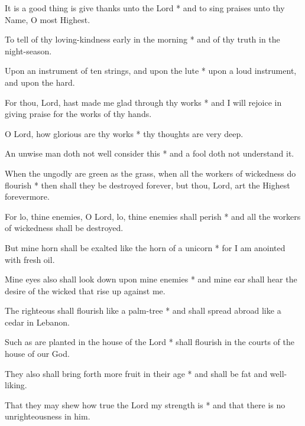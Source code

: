 It is a good thing is give thanks unto the Lord * and to sing praises unto thy Name, O most Highest.

To tell of thy loving-kindness early in the morning * and of thy truth in the night-season.

Upon an instrument of ten strings, and upon the lute * upon a loud instrument, and upon the hard.

For thou, Lord, hast made me glad through thy works * and I will rejoice in giving praise for the works of thy hands.

O Lord, how glorious are thy works * thy thoughts are very deep.

An unwise man doth not well consider this * and a fool doth not understand it.

When the ungodly are green as the grass, when all the workers of wickedness do flourish * then shall they be destroyed forever, but thou, Lord, art the Highest forevermore.

For lo, thine enemies, O Lord, lo, thine enemies shall perish * and all the workers of wickedness shall be destroyed.

But mine horn shall be exalted like the horn of a unicorn * for I am anointed with fresh oil.

Mine eyes also shall look down upon mine enemies * and mine ear shall hear the desire of the wicked that rise up against me.

The righteous shall flourish like a palm-tree * and shall spread abroad like a cedar in Lebanon.

Such as are planted in the house of the Lord * shall flourish in the courts of the house of our God.

They also shall bring forth more fruit in their age * and shall be fat and well-liking.

That they may shew how true the Lord my strength is * and that there is no unrighteousness in him.